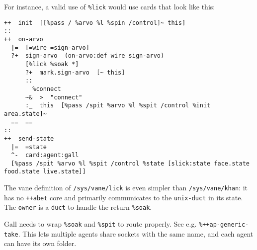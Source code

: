 \documentclass[twoside]{article}
\begin{document}
For instance, a valid use of \texttt{\%lick} would use cards that look like this:

\begin{verbatim}
++  init  [[%pass / %arvo %l %spin /control]~ this]
::
++  on-arvo
  |=  [=wire =sign-arvo]
  ?+  sign-arvo  (on-arvo:def wire sign-arvo)
      [%lick %soak *]
      ?+  mark.sign-arvo  [~ this]
      ::
        %connect
      ~&  >  "connect"
      :_  this  [%pass /spit %arvo %l %spit /control %init area.state]~
  ==  ==
::
++  send-state
  |=  =state
  ^-  card:agent:gall
  [%pass /spit %arvo %l %spit /control %state [slick:state face.state food.state live.state]]
\end{verbatim}

The vane definition of \texttt{/sys/vane/lick} is even simpler than \texttt{/sys/vane/khan}:  it has no \texttt{++abet} core and primarily communicates to the \texttt{unix-duct} in its state.  The \texttt{owner} is a \texttt{duct} to handle the return \texttt{\%soak}.

Gall needs to wrap \texttt{\%soak} and \texttt{\%spit} to route properly.  See e.g. \texttt{\%++ap-generic-take}.  This lets multiple agents share sockets with the same name, and each agent can have its own folder.



\end{document}
